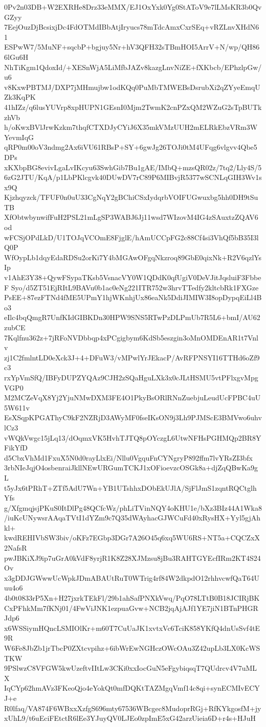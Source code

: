 0Pv2n03DB+W2EXRHe8Drz33eMMX/EJ1OxYxk0Yg0StAToV9e7lLMsKR3b0QvGZyy
7EejOuzDjBcsixjDc4FdOTMdIBbAtjIryucs78mTdcAmxCxrSEq+vRZLnvXHdN61
ESPwW7/5MuNF+sqcbP+bgjuy5Nr+hV3QFH32sTBmHOI5ArrV+N/wp/QH866lGu6H
NhTiKgm1QdoxId/+XESnWjA5LiMfbJAZv8kazgLnvNiZE+fXKbcb/EPhzlpGw/u6
v8KxwPBTMJ/DXP7jMHmujbw1odKQq0PuMbTMWEBsDsrubXi2qZYyeEmqUZk3KqPK
41hIZz/q6lusYUVrp8xpHUPN1GEsnI0Mjm2TwmK2cnPZxQM2WZuG2sTpBUTkzhVb
h/oKwxBVlJrwKzkm7thqfCTXDJyCYiJ6X35mkVMzUUH2mELRkEbzVRm3WYevmIqG
qRP0m00oV3ndmg2Ax6iVU61RBsP+SY+6gwJg26TOJi0tM4UFqg6vlgvv4Qbe5DPs
xKXbpBG8evivLgaLvIKcyu63SwhGib7Bu1gAE/IMbQ+mzsQR02z/7tq2/Lly4S/5
6zG2JTU/KqA/p1LbPKlcgvk40DUwDV7rC89P6MIBvjR5377wSCNLqGIH3Wv1sx9Q
Kjzhqyzck/TFUF0n0uU33CgNqY2gBChiCSxIydqrbVOIFUGwuxbg5hh0DH9tSuTB
XfObtwbynwifFuH2PSL21mLgSP3WABJ6Jj11wsd7WIzovM4IG4zSAuxtzZQAV6od
wFCSjOPdLkD/U1TOJqVCOmE8FjglE/hAmUCCpFG2c88Cf4si3VhQf5bB35I3lQ0P
WfOypLb1dqyEdaRDSu2orKi7Y4bMGAwOFgqNkzroq89GbE0qixNk+R2V6qzlYsIp
v1AhE3Y38+QywFSypaTKsb5VsnacVY0W1QDdK0qfUgiV0DeVJitJqsluiF3FbbeF
Syo/d5ZT51EjRItL9BAVu0b1ac0eNg221ITR752w3hrvTTedfy2kltcbRk1FXGze
PsEE+87ezFTNd4fME5UPmY1hjWKnhjUx86eaNk5DdiJIMIW3I8opDypqEiLl4Bo3
eIlc4bqQmgR7UnfKIdGIBKDn30HPW9SNS5RTwPzDLPmUb7R5L6+bmI/AU62zubCE
7Kqlfnu362z+7jRFoNVDbbqp4xPCgigbym6KdSb5eszgin3oMnOMDEnAR1t7Vnlv
zj1C2fmlntLD0eXck3J+4+DFuW3/vMPwlYrJEkacP/AvRFPNSYI16TTHd6oZf9c3
rxYpVmSfQ/IBFyDUPZYQAz9CJH2zSQaHguLXk3x0cJLtHSMU5vtPFlxgvMpgVGP0
M2MCZeVqX8Yj2YjuNMwDXM3FE4O1PkyBsORlRNnZuebjuLeudUcFPBC4uU5W611v
EsXSqpKPGAThyC9kF2NZRjD3AWyMF0fseIKsON9j3Lh9PJMScE3BMVwo6uhvlCz3
vWQkVwgc15jLq13/dOqmxVK5HvhTJTQ8pOYczgL6UtwNFHsPGHMQp2BR8YFikYfD
d5CbxVhMd1FxuX5N0d0rayLlxEi/Nllu0VgquFnCYNgryP892ffm7lvYRsZI3bfx
3rbNIeJqjO4osbenraiJkllNEwURGumTCKJ1xOFioevzcOSGk8a+djZqQBwKa9gL
t5yJx6tPRhT+ZTf5AdU7Wn+YB1UTshhxDObEkUJlA/SjFlJmS1zqntRQCtglhYfs
g/XfgmqjsjPKuS0ItDlPg48QCfcWz/phLiTVinNQY4oKHU1e/bXz3BIz44A1Wka8
/iuKcUNywsrAAqaTVtI1dYZm9c7Q35dWAyhacGJWCuFd40xRysHX+Yyl5gjAhkl+
kwdREHIVbSW3biv/oKFz7EGbp3DGr7A26O45q6xq5WU6RS+NT5a+CQCZxX2NafsR
pwJBKiXJ9ip7uGrA0kVdF8yrjR1K8Z28XJMzsu8jBu3RAHTGYEcfIRm2KT4S24Ov
x3gDDJGWwwUcWpkJDmABAUtRuT0WTrig4rf84W2dkpdO12rhhvcwfQaT64Uuu4o6
4b0t0833rP5Xn+H27jxrkTEkFl/29b1ahSafPNXkVwq/PqO78LTtB0B18JCIRjBK
CxPFhkMm7fKNj01/4FwViJNK1ezpuaGvw+NCB2jqAjAJf1YE7jiN1BTnPHGRJdp6
x6WSSiymHQncLSMIOlKr+m60T7CuUaJK1xvtxVc6TciK858YKfQ4dnUsSvf4tE9R
W6Fe8JbZb1jrTbcP0ZXtcvpihz+6ibWrEwNGHczOWcOAu3Z42upLb3LX0KcWSTKW
9PSlwzC8VFGW5kwUzeftvIItLw3CKi0xxIocGuN5eFgybiqsqT7QUdrcv4V7uMLX
IqCYp62hmAVz3FKeoQjo4eYokQt0mfDQKtTAZMgqVmf14c8qi+synECMIvECYJ+e
R0lfaq/VA874F6WBxxXzfgS696mty67536WBcgec8MudoprRGj+RfKYkgosfM+jy
xUhL9/t6uEciFEtctR6lEe3YJuyQV0LJEo0zpImE5xG42arzUieia6D+r4s+HJuH
